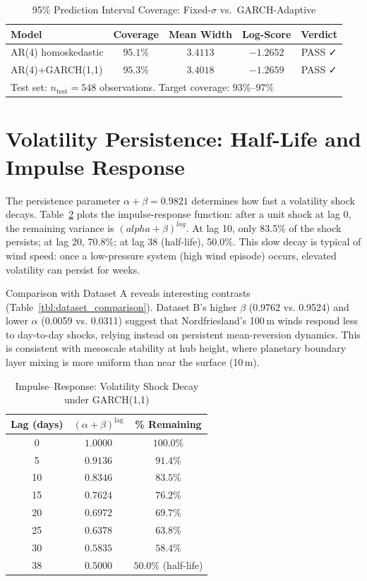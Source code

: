 \documentclass[11pt, a4paper, twoside]{article}
\begin{document}
\begin{table}[ht]
\centering
\caption{95\% Prediction Interval Coverage: Fixed-$\sigma$ vs.\ GARCH-Adaptive}
\label{tbl:interval_forecast}
\small
\begin{tabularx}{\textwidth}{l|ccc|c}
\toprule
\textbf{Model} & \textbf{Coverage} & \textbf{Mean Width} & \textbf{Log-Score} & \textbf{Verdict} \\
\midrule
AR(4) homoskedastic & $95.1\%$ & $3.4113$ & $-1.2652$ & PASS ✓ \\
AR(4)+GARCH(1,1) & $95.3\%$ & $3.4018$ & $-1.2659$ & PASS ✓ \\
\midrule
\multicolumn{5}{l}{Test set: $n_{\text{test}} = 548$ observations. Target coverage: $93\%$--$97\%$} \\
\bottomrule
\end{tabularx}
\end{table}

\section{Volatility Persistence: Half-Life and Impulse Response}

The persistence parameter $\alpha + \beta = 0.9821$ determines how fast a volatility shock decays. Table~\ref{tbl:impulse_response} plots the impulse-response function: after a unit shock at lag 0, the remaining variance is $(alpha + \beta)^{lag}$. At lag 10, only 83.5\% of the shock persists; at lag 20, 70.8\%; at lag 38 (half-life), 50.0\%. This slow decay is typical of wind speed: once a low-pressure system (high wind episode) occurs, elevated volatility can persist for weeks.

Comparison with Dataset A reveals interesting contrasts (Table~\ref{tbl:dataset_comparison}). Dataset B's higher $\beta$ (0.9762 vs. 0.9524) and lower $\alpha$ (0.0059 vs. 0.0311) suggest that Nordfriesland's 100\,m winds respond less to day-to-day shocks, relying instead on persistent mean-reversion dynamics. This is consistent with mesoscale stability at hub height, where planetary boundary layer mixing is more uniform than near the surface (10\,m).

\begin{table}[ht]
\centering
\caption{Impulse--Response: Volatility Shock Decay under GARCH(1,1)}
\label{tbl:impulse_response}
\small
\begin{tabularx}{0.6\textwidth}{c|c|c}
\toprule
\textbf{Lag (days)} & $(\alpha+\beta)^{\text{lag}}$ & \textbf{\% Remaining} \\
\midrule
0 & $1.0000$ & $100.0\%$ \\
5 & $0.9136$ & $91.4\%$ \\
10 & $0.8346$ & $83.5\%$ \\
15 & $0.7624$ & $76.2\%$ \\
20 & $0.6972$ & $69.7\%$ \\
25 & $0.6378$ & $63.8\%$ \\
30 & $0.5835$ & $58.4\%$ \\
38 & $0.5000$ & $50.0\%$ (half-life) \\
\bottomrule
\end{tabularx}
\end{table}
\end{document}
